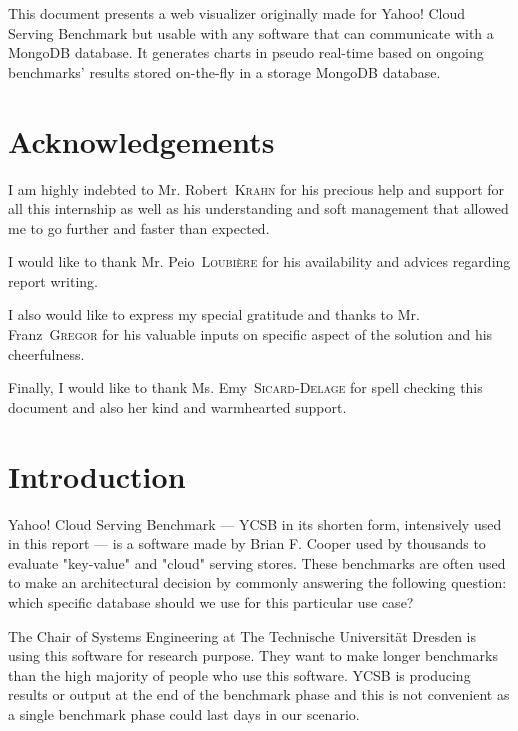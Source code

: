 \documentclass[a4paper,11pt]{report}
\newcommand*{\auteur}[2]{\large #1~\textsc{#2}} %
\begin{document}
This document presents a web visualizer originally made for Yahoo! Cloud Serving Benchmark but usable with any software that can communicate with a MongoDB database. It generates charts in pseudo real-time based on ongoing benchmarks' results stored on-the-fly in a storage MongoDB database. 

\tableofcontents

\newpage

\listoffigures  %

\newpage
\chapter*{Acknowledgements}

I am highly indebted to Mr. \auteur{Robert}{Krahn} for his precious help and support for all this internship as well as his understanding and soft management that allowed me to go further and faster than expected.

I would like to thank Mr. \auteur{Peio}{Loubière} for his availability and advices regarding report writing.

I also would like to express my special gratitude and thanks to Mr. \auteur{Franz}{Gregor} for his valuable inputs on specific aspect of the solution and his cheerfulness.

Finally, I would like to thank Ms. \auteur{Emy}{Sicard-Delage} for spell checking this document and also her kind and warmhearted support.

\chapter*{Introduction}

Yahoo! Cloud Serving Benchmark --- YCSB in its shorten form, intensively used in this report --- is a software made by Brian F. Cooper \cite{ycsb:repo} used by thousands to evaluate "key-value" and "cloud" serving stores. These benchmarks are often used to make an architectural decision by commonly answering the following question: which specific database should we use for this particular use case?

The Chair of Systems Engineering at The Technische Universität Dresden is using this software for research purpose. They want to make longer benchmarks than the high majority of people who use this software. YCSB is producing results or output at the end of the benchmark phase and this is not convenient as a single benchmark phase could last days in our scenario.
\end{document}
